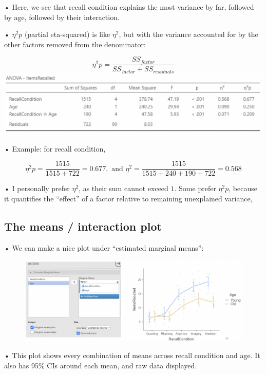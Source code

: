 \documentclass[
  letterpaper,
  DIV=11,
  numbers=noendperiod]{scrreprt}
\begin{document}
• Here, we see that recall condition explains the most variance by far,
followed by age, followed by their interaction.

• \(\eta^2p\) (partial eta-squared) is like \(\eta^2\), but with the
variance accounted for by the other factors removed from the
denominator:

\[
\eta^2p = \frac{SS_{factor}}{SS_{factor} + SS_{residuals}}
\] \includegraphics{images/Mod5_4.png}

• Example: for recall condition,

\[
\eta^2p = \frac{1515}{1515 + 722} = 0.677, \text{ and } \eta^2 = \frac{1515}{1515 + 240 + 190 + 722} = 0.568
\]

• I personally prefer \(\eta^2\), as their sum cannot exceed \(1\). Some
prefer \(\eta^2p\), because it quantifies the ``effect'' of a factor
relative to remaining unexplained variance,

\hypertarget{the-means-interaction-plot}{%
\subsection{The means / interaction
plot}\label{the-means-interaction-plot}}

• We can make a nice plot under ``estimated marginal means'':

\begin{figure}

{\centering \includegraphics{images/Mod5_5.png}

}

\end{figure}

• This plot shows every combination of means across recall condition and
age. It also has 95\% CIs around each mean, and raw data displayed.
\end{document}
